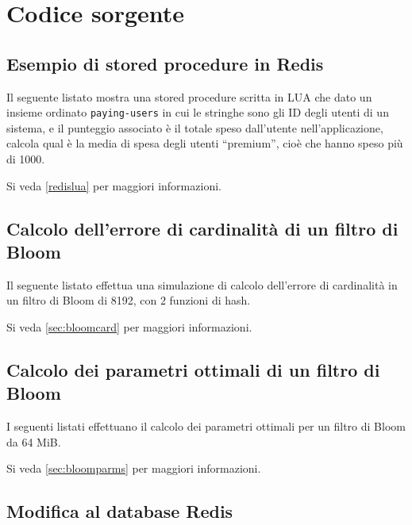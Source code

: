 \chapter{Codice sorgente}

\section{Esempio di stored procedure in Redis}

Il seguente listato mostra una stored procedure scritta in LUA che dato un insieme ordinato
\verb|paying-users| in cui le stringhe sono gli ID degli utenti di un sistema, e il punteggio
associato è il totale speso dall'utente nell'applicazione, calcola qual è la media di spesa degli
utenti ``premium'', cioè che hanno speso più di \SI{1000}{\EUR}.

Si veda \ref{redislua} per maggiori informazioni.



\section{Calcolo dell'errore di cardinalità di un filtro di Bloom}

Il seguente listato effettua una simulazione di calcolo dell'errore di cardinalità in un filtro
di Bloom di \SI{8192}{\bit}, con $2$ funzioni di hash.

Si veda \ref{sec:bloomcard} per maggiori informazioni.



\section{Calcolo dei parametri ottimali di un filtro di Bloom}

I seguenti listati effettuano il calcolo dei parametri ottimali per un filtro di Bloom da 64 MiB.

Si veda \ref{sec:bloomparms} per maggiori informazioni.



\section{Modifica al database Redis}
\label{sec:modredis}

